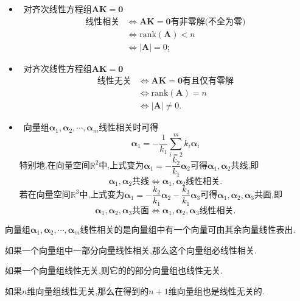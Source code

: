 \documentclass[9pt,a4paper]{book}
\begin{document}
\begin{defination}[线性关系]
	\begin{itemize}
	\item[\color{HotPink1} \textleaf ] {\color{HotPink1}}\ 对齐次线性方程组$ \bm{AK}=\bm{0} $\begin{align*}
 \mbox{线性相关}&\Leftrightarrow\bm{AK}=\bm{0}\mbox{有非零解(不全为零)}\\
 				&\Leftrightarrow\mathrm{rank}(\bm{A})<n\\
 				&\Leftrightarrow|\bm{A}|=0;	\end{align*}
	\item[\color{HotPink1} \textleaf ] {\color{HotPink1}}\ 对齐次线性方程组$ \bm{AK}=\bm{0} $\begin{align*}
	\mbox{线性无关}&\Leftrightarrow\bm{AK}=\bm{0}\mbox{有且仅有零解}\\
	&\Leftrightarrow\mathrm{rank}(\bm{A})=n\\
	&\Leftrightarrow|\bm{A}|\neq0.	\end{align*}
\end{itemize}
	\begin{itemize}
	\item[\color{HotPink1} \textleaf ] {\color{HotPink1}}\ 向量组$\bm{\alpha}_1,\bm{\alpha}_2,\cdots,\bm{\alpha}_m $线性相关时可得\[ \bm{\alpha}_1=-\frac{1}{k_1}\sum_{i=2}^m{k_i\bm{\alpha}_i} \]特别地,在向量空间$ \mathbb{R}^2 $中,上式变为$ \bm{\alpha}_1=-\dfrac{k_2}{k_1}\bm{\alpha}_2 $可得$ \bm{\alpha}_1,\bm{\alpha}_2 $共线,即\[ \bm{\alpha}_1,\bm{\alpha}_2\mbox{共线}\Leftrightarrow\bm{\alpha}_1,\bm{\alpha}_2\mbox{线性相关}. \]
	若在向量空间$ \mathbb{R}^3 $中,上式变为$ \bm{\alpha}_1=-\dfrac{k_2}{k_1}\bm{\alpha}_2 -\dfrac{k_3}{k_1}\bm{\alpha}_3$可得$ \bm{\alpha}_1,\bm{\alpha}_2,\bm{\alpha}_3 $共面,即\[ \bm{\alpha}_1,\bm{\alpha}_2,\bm{\alpha}_3\mbox{共面}\Leftrightarrow\bm{\alpha}_1,\bm{\alpha}_2,\bm{\alpha}_3\mbox{线性相关}. \]
\end{itemize}
\end{defination}
\begin{theorem}
	 向量组$\bm{\alpha}_1,\bm{\alpha}_2,\cdots,\bm{\alpha}_m $线性相关的是向量组中有一个向量可由其余向量线性表出.
\end{theorem}
\begin{theorem}
	如果一个向量组中一部分向量线性相关,那么这个向量组必线性相关.
\end{theorem}
\begin{theorem}
	如果一个向量组线性无关,则它的的部分向量组也线性无关.
\end{theorem}
\begin{theorem}
	如果$ n $维向量组线性无关,那么在得到的$ n+1 $维向量组也是线性无关的.
\end{theorem}
\end{document}

